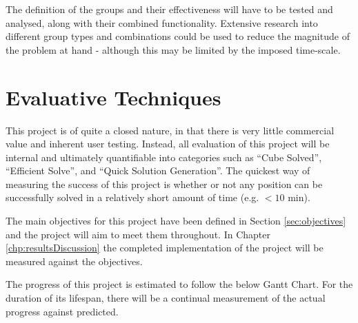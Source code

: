 \documentclass{report}
\begin{document}
    The definition of the groups and their effectiveness will have to be tested and analysed, along with their combined functionality. Extensive research into different group types and combinations could be used to reduce the magnitude of the problem at hand - although this may be limited by the imposed time-scale.
    
    \section{Evaluative Techniques} \label{sec:evalTechniques}
    
    This project is of quite a closed nature, in that there is very little commercial value and inherent user testing. Instead, all evaluation of this project will be internal and ultimately quantifiable into categories such as \enquote{Cube Solved}, \enquote{Efficient Solve}, and \enquote{Quick Solution Generation}. The quickest way of measuring the success of this project is whether or not any position can be successfully solved in a relatively short amount of time (e.g. $<10$ \si{\minute}). 
    
    The main objectives for this project have been defined in Section \ref{sec:objectives} and the project will aim to meet them throughout. In Chapter \ref{chp:resultsDiscussion} the completed implementation of the project will be measured against the objectives.
    
    The progress of this project is estimated to follow the below Gantt Chart. For the duration of its lifespan, there will be a continual measurement of the actual progress against predicted.
    
\end{document}
